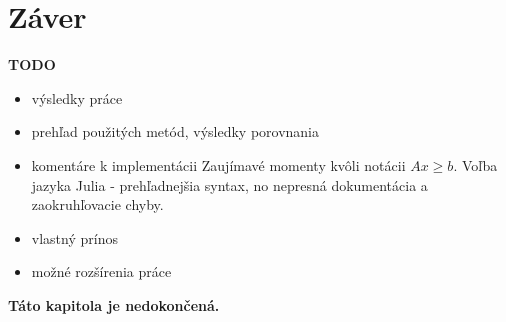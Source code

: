 \chapter*{Záver}  %

\textbf{TODO}
\begin{itemize}
	\item výsledky práce
	\item prehľad použitých metód, výsledky porovnania
	\item komentáre k implementácii
	Zaujímavé momenty kvôli notácii $Ax \geq b$.
	Voľba jazyka Julia - prehľadnejšia syntax, no nepresná dokumentácia a zaokruhľovacie chyby.

	\item vlastný prínos
	\item možné rozšírenia práce 

\end{itemize}

\textbf{Táto kapitola je nedokončená.}